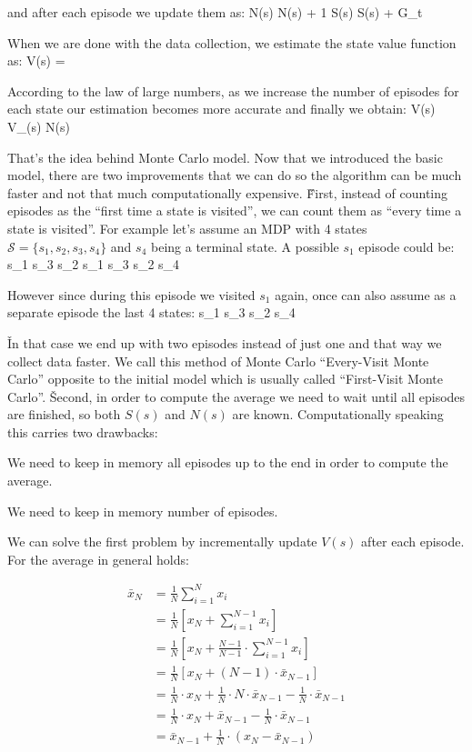 and after each episode we update them as:
\bse
N(s) \gets N(s) + 1 \qquad {} \qquad S(s) \gets S(s) + G_t
\ese

When we are done with the data collection, we estimate the state value function as:
\bse
V(s) = 
\ese

According to the law of large numbers, as we increase the number of episodes for each state our estimation becomes
more accurate and finally we obtain:
\bse
V(s) \to V_{\pi}(s) \:\:  \:\: N(s) \to \infty
\ese

That's the idea behind Monte Carlo model. Now that we introduced the basic model, there are two improvements that we
can do so the algorithm can be much faster and not that much computationally expensive. \v

First, instead of counting episodes as the ``first time a state is visited'', we can count them as ``every time a
state is visited''. For example let's assume an MDP with 4 states $\mathcal{S} = \{s_1, s_2, s_3,s_4\}$ and $s_4$
being a terminal state. A possible $s_1$ episode could be:
\bse
s_1 \to s_3 \to s_2 \to s_1 \to s_3 \to s_2 \to s_4
\ese

However since during this episode we visited $s_1$ again, once can also assume as a separate episode the last 4 states:
\bse
s_1 \to s_3 \to s_2 \to s_4
\ese

\v

In that case we end up with two episodes instead of just one and that way we collect data faster. We call this method
of Monte Carlo ``Every-Visit Monte Carlo'' opposite to the initial model which is usually called ``First-Visit Monte
Carlo''. \v

Second, in order to compute the average we need to wait until all episodes are finished, so both $S(s)$ and $N(s)$
are known. Computationally speaking this carries two drawbacks:
\bit
\item We need to keep in memory all episodes up to the end in order to compute the average.
\item We need to keep in memory number of episodes.
\eit

We can solve the first problem by incrementally update $V(s)$ after each episode. For the average in general holds:

\vspace{-20pt}

{\setlength{\jot}{10pt}
\begin{align*}
\bar{x}_N &= \frac{1}{N} \sum_{i=1}^{N} x_i \\
&= \frac{1}{N} \left[ x_N + \sum_{i=1}^{N-1} x_i \right] \\
&= \frac{1}{N} \left[ x_N + \frac{N-1}{N-1} \cdot \sum_{i=1}^{N-1} x_i \right] \\
&= \frac{1}{N} \left[ x_N + (N-1) \cdot \bar{x}_{N-1} \right] \\
&= \frac{1}{N} \cdot x_N + \frac{1}{N} \cdot N \cdot \bar{x}_{N-1} - \frac{1}{N} \cdot \bar{x}_{N-1} \\
&= \frac{1}{N} \cdot x_N + \bar{x}_{N-1} - \frac{1}{N} \cdot \bar{x}_{N-1} \\
&= \bar{x}_{N-1} + \frac{1}{N} \cdot (x_N - \bar{x}_{N-1})
\end{align*}}

